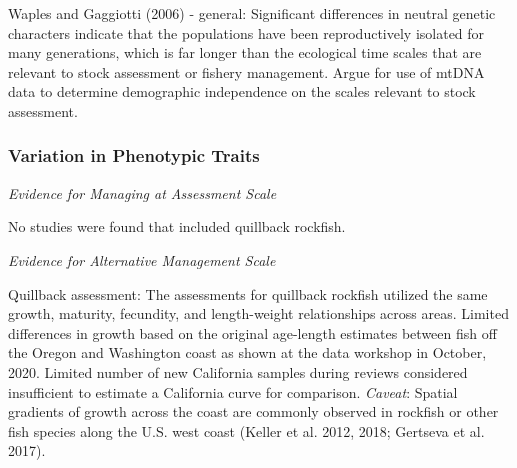 \documentclass[11pt,
  english,
  letterpaper,
]{article}
\begin{document}

Waples and Gaggiotti {(2006)\leavevmode\tagmcend\tagstructend} - general: Significant differences in neutral genetic characters indicate that the populations have been reproductively isolated for many generations, which is far longer than the ecological time scales that are relevant to stock assessment or fishery management. Argue for use of mtDNA data to determine demographic independence on the scales relevant to stock assessment.

\leavevmode\tagmcend\tagstructend\par


\hypertarget{variation-in-phenotypic-traits}{%
\subsubsection{Variation in Phenotypic Traits}\label{variation-in-phenotypic-traits}}

\leavevmode\tagmcend\tagstructend


\emph{Evidence for Managing at Assessment Scale}

\leavevmode\tagmcend\tagstructend\par


No studies were found that included quillback rockfish.

\leavevmode\tagmcend\tagstructend\par


\emph{Evidence for Alternative Management Scale}

\leavevmode\tagmcend\tagstructend\par


Quillback assessment: The assessments for quillback rockfish utilized the same growth, maturity, fecundity, and length-weight relationships across areas. Limited differences in growth based on the original age-length estimates between fish off the Oregon and Washington coast as shown at the data workshop in October, 2020. Limited number of new California samples during reviews considered insufficient to estimate a California curve for comparison. \emph{Caveat}: Spatial gradients of growth across the coast are commonly observed in rockfish or other fish species along the U.S. west coast {(Keller et al. 2012, 2018; Gertseva et al. 2017)\leavevmode\tagmcend\tagstructend}.
\end{document}
